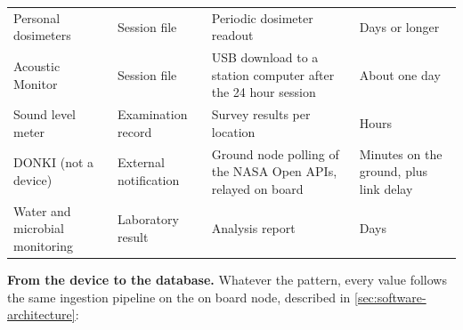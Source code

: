 \begin{table}[htbp]
\begin{tabular}{p{3.0cm}p{2.6cm}p{4.4cm}p{4.0cm}}
Personal dosimeters & Session file & Periodic dosimeter readout & Days or longer \\
Acoustic Monitor & Session file & USB download to a station computer after the 24 hour session & About one day \\
Sound level meter & Examination record & Survey results per location & Hours \\
DONKI (not a device) & External notification & Ground node polling of the NASA Open APIs, relayed on board & Minutes on the ground, plus link delay \\
Water and microbial monitoring & Laboratory result & Analysis report & Days \\
\hline
\end{tabular}
\vspace{1.2em}
\end{table}

\medskip\noindent\textbf{From the device to the database.} Whatever the pattern, every value follows the same ingestion pipeline on the on board node, described in \ref{sec:software-architecture}:

